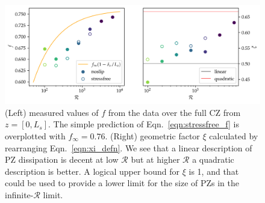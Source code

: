 \documentclass[12pt]{article}
\begin{document}
\begin{figure}[ht!]
\centering
\includegraphics[width=\textwidth]{f_scaling.png}
\caption{
(Left) measured values of $f$ from the data over the full CZ from $z = [0, L_s]$.
The simple prediction of Eqn.~\ref{eqn:stressfree_f} is overplotted with $f_{\infty} = 0.76$.
(Right) geometric factor $\xi$ calculated by rearranging Eqn.~\ref{eqn:xi_defn}.
We see that a linear description of PZ dissipation is decent at low $\mathcal{R}$ but at higher $\mathcal{R}$ a quadratic description is better.
A logical upper bound for $\xi$ is 1, and that could be used to provide a lower limit for the size of PZs in the infinite-$\mathcal{R}$ limit.
\label{fig:f_and_xi}
}
\end{figure}



\end{document}
